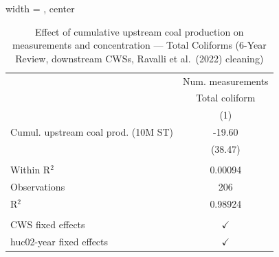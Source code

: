 
\begin{table}[htbp]
   
   \caption{\label{tab:6yr_huc02fe_cnt_tc_ravalli} Effect of cumulative upstream coal production on measurements and concentration --- Total Coliforms (6-Year Review, downstream CWSs, Ravalli et al.~(2022) cleaning)}
   \bigskip
   
   \centering
   
   \begin{adjustbox}{width = \textwidth, center}
      
      
      \begin{tabular}{lc}
         \toprule
         
                                             & Num. measurements\\  
         
                                             & Total coliform \\   
         
                                             & (1)\\  
         
         \midrule 
         Cumul. upstream coal prod. (10M ST) & -19.60\\   
                                             & (38.47)\\   
         
          \\
         
         Within R$^2$                        & 0.00094\\  
         Observations                        & 206\\  
         R$^2$                               & 0.98924\\  
         
          \\
         
         CWS fixed effects                   & $\checkmark$\\   
         huc02-year fixed effects            & $\checkmark$\\   
         
         \bottomrule
         
      \end{tabular}
      
      

\end{adjustbox}
\end{table}
